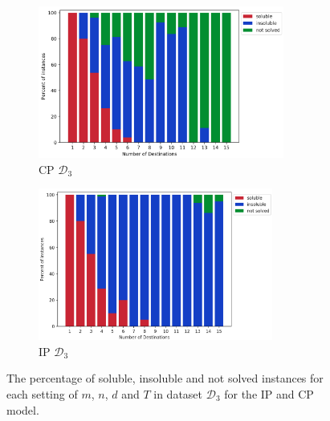 \documentclass{mpaper}
\begin{document}
\begin{figure}
    \centering
    \begin{subfigure}[b]{0.48\textwidth}
        \includegraphics[width=\textwidth, height=5cm]{cpipexperiments/satunsatnotsolved_cp_d.png}
        \caption{CP $\mathcal{D}_3$}
        \label{fig:satunsatnotsolved_cp_d}
    \end{subfigure}
    \begin{subfigure}[b]{0.48\textwidth}
        \includegraphics[width=\textwidth, height=5cm]{cpipexperiments/satunsatnotsolved_ip_d.png}
        \caption{IP $\mathcal{D}_3$}
        \label{fig:satunsatnotsolved_ip_d}
    \end{subfigure}
    \caption{The percentage of soluble, insoluble and not solved instances for each setting of $m$, $n$, $d$ and $T$ in dataset $\mathcal{D}_3$ for the IP and CP model.}
    \label{fig:satunsatnotsolved_cp_ip_d}
\end{figure}
\end{document}
